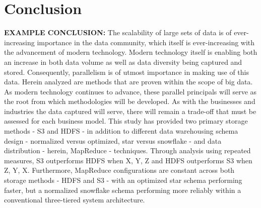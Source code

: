 \documentclass[journal]{IEEEtran}
\begin{document}
\section{Conclusion}
\textbf{EXAMPLE CONCLUSION:}
The scalability of large sets of data is of ever-increasing importance in the data community, which itself is ever-increasing with the advancement of modern technology. Modern technology itself is enabling both an increase in both data volume as well as data diversity being captured and stored. Consequently, parallelism is of utmost importance in making use of this data. Herein analyzed are methods that are proven within the scope of big data. As modern technology continues to advance, these parallel principals will serve as the root from which methodologies will be developed. As with the businesses and industries the data captured will serve, there will remain a trade-off that must be assessed for each business model. This study has provided two primary storage methods - S3 and HDFS - in addition to different data warehousing schema design - normalized versus optimized, star versus snowflake - and data distribution - herein, MapReduce - techniques. Through analysis using repeated measures, S3 outperforms HDFS when X, Y, Z and HDFS outperforms S3 when Z, Y, X. Furthermore, MapReduce configurations are constant across both storage methods - HDFS and S3 - with an optimized star schema performing faster, but a normalized snowflake schema performing more reliably within a conventional three-tiered system architecture.

\ifCLASSOPTIONcaptionsoff
  \newpage
\fi
\end{document}
